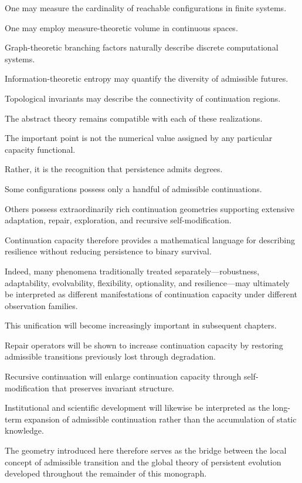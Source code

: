 \documentclass[11pt]{book}
\numberwithin{equation}{chapter}
\theoremstyle{definition}
\theoremstyle{plain}
\begin{document}
One may measure the cardinality of reachable configurations in finite systems.

One may employ measure-theoretic volume in continuous spaces.

Graph-theoretic branching factors naturally describe discrete computational systems.

Information-theoretic entropy may quantify the diversity of admissible futures.

Topological invariants may describe the connectivity of continuation regions.

The abstract theory remains compatible with each of these realizations.

The important point is not the numerical value assigned by any particular capacity functional.

Rather, it is the recognition that persistence admits degrees.

Some configurations possess only a handful of admissible continuations.

Others possess extraordinarily rich continuation geometries supporting extensive adaptation, repair, exploration, and recursive self-modification.

Continuation capacity therefore provides a mathematical language for describing resilience without reducing persistence to binary survival.

Indeed, many phenomena traditionally treated separately—robustness, adaptability, evolvability, flexibility, optionality, and resilience—may ultimately be interpreted as different manifestations of continuation capacity under different observation families.

This unification will become increasingly important in subsequent chapters.

Repair operators will be shown to increase continuation capacity by restoring admissible transitions previously lost through degradation.

Recursive continuation will enlarge continuation capacity through self-modification that preserves invariant structure.

Institutional and scientific development will likewise be interpreted as the long-term expansion of admissible continuation rather than the accumulation of static knowledge.

The geometry introduced here therefore serves as the bridge between the local concept of admissible transition and the global theory of persistent evolution developed throughout the remainder of this monograph.
\end{document}
